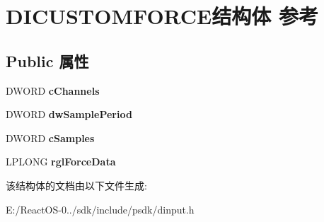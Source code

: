 \hypertarget{struct_d_i_c_u_s_t_o_m_f_o_r_c_e}{}\section{D\+I\+C\+U\+S\+T\+O\+M\+F\+O\+R\+C\+E结构体 参考}
\label{struct_d_i_c_u_s_t_o_m_f_o_r_c_e}
\subsection*{Public 属性}
\begin{DoxyCompactItemize}
\item 
\mbox{\label{struct_d_i_c_u_s_t_o_m_f_o_r_c_e_abc5a17bc4ab35ee7874d7cb1e478ebfa}} 
D\+W\+O\+RD {\bfseries c\+Channels}
\item 
\mbox{\label{struct_d_i_c_u_s_t_o_m_f_o_r_c_e_a2d1d39ef900d1fb0a4dc4bcfb39e1e53}} 
D\+W\+O\+RD {\bfseries dw\+Sample\+Period}
\item 
\mbox{\label{struct_d_i_c_u_s_t_o_m_f_o_r_c_e_aed380c058885431ab00f2749524a9f04}} 
D\+W\+O\+RD {\bfseries c\+Samples}
\item 
\mbox{\label{struct_d_i_c_u_s_t_o_m_f_o_r_c_e_a551e9b00404984a9e6025bc65c92a0a9}} 
L\+P\+L\+O\+NG {\bfseries rgl\+Force\+Data}
\end{DoxyCompactItemize}


该结构体的文档由以下文件生成\+:\begin{DoxyCompactItemize}
\item 
E\+:/\+React\+O\+S-\/0../sdk/include/psdk/dinput.\+h\end{DoxyCompactItemize}
